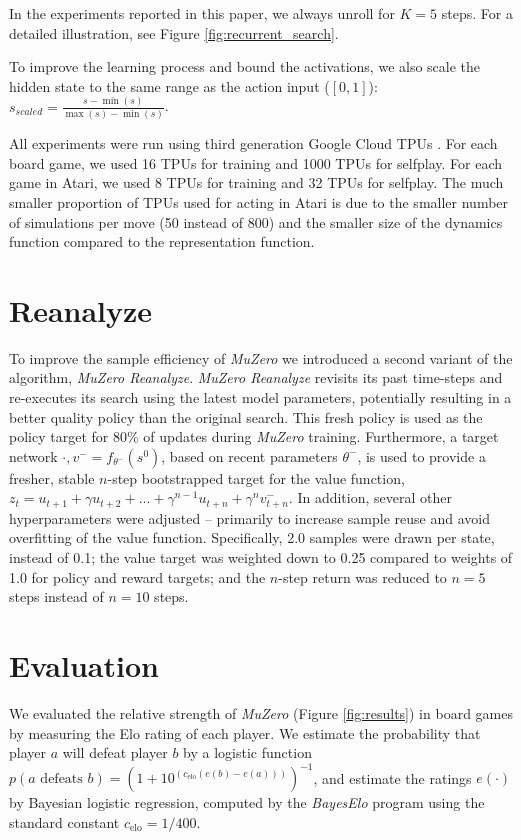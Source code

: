 \documentclass{article}
\newcommand{\muzero}{\emph{MuZero}}
\newcommand{\reanalyze}{\emph{MuZero Reanalyze}}
\begin{document}
\begin{appendices}
In the experiments reported in this paper, we always unroll for $K=5$ steps. For a detailed illustration, see Figure \ref{fig:recurrent_search}.

To improve the learning process and bound the activations, we also scale the hidden state to the same range as the action input ($[0, 1]$): $s_{scaled} = \frac{s - \min(s)}{\max(s) - \min(s)}$.

All experiments were run using third generation Google Cloud TPUs \cite{tpuv3}. For each board game, we used 16 TPUs for training and 1000 TPUs for selfplay. %
For each game in Atari, we used 8 TPUs for training and 32 TPUs for selfplay. %
The much smaller proportion of TPUs used for acting in Atari is due to the smaller number of simulations per move (50 instead of 800) and the smaller size of the dynamics function compared to the representation function.


\section{Reanalyze}
\label{reanalyze}

To improve the sample efficiency of \muzero{} we introduced a second variant of the algorithm, \reanalyze{}. \reanalyze{} revisits its past time-steps and re-executes its search using the latest model parameters, potentially resulting in a better quality policy than the original search. This fresh policy is used as the policy target for 80\% of updates during \muzero{} training. Furthermore, a target network \cite{dqn} $\cdot, v^- = f_{\theta^-}(s^0)$, based on recent parameters $\theta^-$, is used to provide a fresher, stable $n$-step bootstrapped target for the value function, $z_t = u_{t+1} + \gamma u_{t+2} + ... + \gamma^{n-1} u_{t+n} + \gamma^n v^-_{t+n}$. In addition, several other hyperparameters were adjusted -- primarily to increase sample reuse and avoid overfitting of the value function. Specifically, 2.0 samples were drawn per state, instead of 0.1; the value target was weighted down to 0.25 compared to weights of 1.0 for policy and reward targets; and the $n$-step return was reduced to $n=5$ steps instead of $n=10$ steps.

\section{Evaluation}

We evaluated the relative strength of \muzero{} (Figure \ref{fig:results}) in board games by measuring the Elo rating of each player. We estimate the probability that player $a$ will defeat player $b$ by a logistic function $p(a \text{ defeats } b) = (1 + 10^{(c_{\mathrm{elo}} (e(b) - e(a)))})^{-1}$, and estimate the ratings $e(\cdot)$ by Bayesian logistic regression, computed by the \emph{BayesElo} program \cite{coulom:bayeselo} using the standard constant $c_{\mathrm{elo}} = 1/400$.


\end{appendices}
\end{document}
